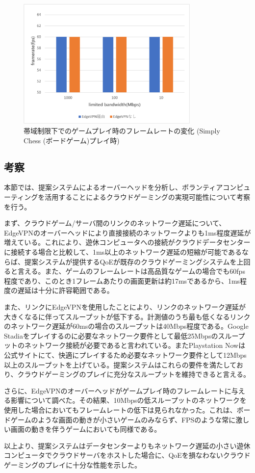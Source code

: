 \begin{figure}[h!]
    \centering
    \includegraphics[width=0.8\textwidth,keepaspectratio,clip]{img/framerate_Board.pdf}
    \caption{帯域制限下でのゲームプレイ時のフレームレートの変化 (Simply Chess (ボードゲーム)プレイ時)}
    \label{fig:fps_board}
\end{figure}

\subsection{考察}
本節では、提案システムによるオーバーヘッドを分析し、ボランティアコンピューティングを活用することによるクラウドゲーミングの実現可能性について考察を行う。

まず、クラウドゲーム/サーバ間のリンクのネットワーク遅延について、EdgeVPNのオーバーヘッドにより直接接続のネットワークよりも1ms程度遅延が増えている。これにより、遊休コンピュータへの接続がクラウドデータセンターに接続する場合と比較して、1ms以上のネットワーク遅延の短縮が可能であるならば、提案システムが提供するQoEが既存のクラウドゲーミングシステムを上回ると言える。また、ゲームのフレームレートは高品質なゲームの場合でも60fps程度であり、このとき1フレームあたりの画面更新は約17msであるから、1ms程度の遅延は十分に許容範囲である。

また、リンクにEdgeVPNを使用したことにより、リンクのネットワーク遅延が大きくなるに伴ってスループットが低下する。計測値のうち最も低くなるリンクのネットワーク遅延が60msの場合のスループットは40Mbps程度である。Google Stadiaをプレイするのに必要なネットワーク要件として最低25Mbpsのスループットのネットワーク接続が必要であると言われている\cite{stadia_band}。またPlaystation Nowは公式サイトにて、快適にプレイするため必要なネットワーク要件として12Mbps以上のスループットを上げている\cite{ps-now}。提案システムはこれらの要件を満たしており、クラウドゲーミングのプレイに充分なスループットを維持できると言える。

さらに、EdgeVPNのオーバーヘッドがゲームプレイ時のフレームレートに与える影響について調べた。その結果、10Mbpsの低スループットのネットワークを使用した場合においてもフレームレートの低下は見られなかった。これは、ボードゲームのような画面の動きが小さいゲームのみならず、FPSのような常に激しい画面の動きを伴うゲームにおいても同様である。

以上より、提案システムはデータセンターよりもネットワーク遅延の小さい遊休コンピュータでクラウドサーバをホストした場合に、QoEを損なわないクラウドゲーミングのプレイに十分な性能を示した。



